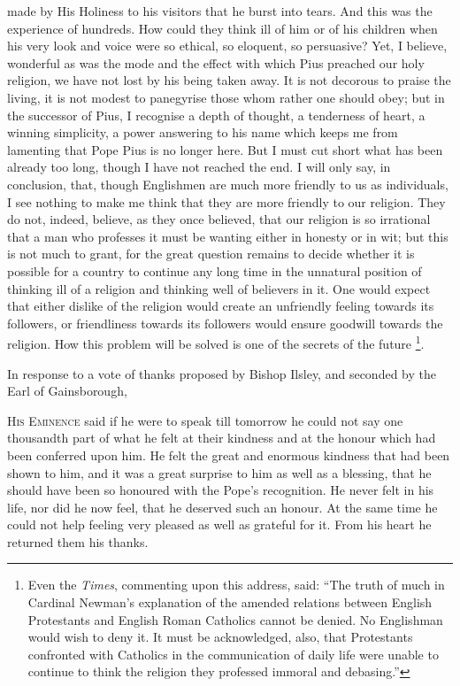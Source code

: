 made by His Holiness to his visitors that he burst into tears. And
this was the experience of hundreds. How could they think ill of him
or of his children when his very look and voice were so ethical, so
eloquent, so persuasive? Yet, I believe, wonderful as was the mode and
the effect with which Pius preached our holy religion, we have not
lost by his being taken away. It is not decorous to praise the living,
it is not modest to panegyrise those whom rather one should obey; but
in the successor of Pius, I recognise a depth of thought, a tenderness
of heart, a winning simplicity, a power answering to his name which
keeps me from lamenting that Pope Pius is no longer here. But I must
cut short what has been already too long, though I have not reached
the end. I will only say, in conclusion, that, though Englishmen are
much more friendly to us as individuals, I see nothing to make me
think that they are more friendly to our religion. They do not,
indeed, believe, as they once believed, that our religion is so
irrational that a man who professes it must be wanting either in
honesty or in wit; but this is not much to grant, for the great
question remains to decide whether it is possible for a country to
continue any long time in the unnatural position of thinking ill of a
religion and thinking well of believers in it. One would expect that
either dislike of the religion would create an unfriendly feeling
towards its followers, or friendliness towards its followers would
ensure goodwill towards the religion. How this problem will be solved
is one of the secrets of the future \footnote{Even the \emph{Times}, commenting upon this address, said: ``The truth
of much in Cardinal Newman's explanation of the amended relations
between English Protestants and English Roman Catholics cannot be
denied. No Englishman would wish to deny it. It must be acknowledged,
also, that Protestants confronted with Catholics in the communication
of daily life were unable to continue to think the religion they
professed immoral and debasing.''}.

In response to a vote of thanks
proposed by Bishop Ilsley, and seconded by the Earl of Gainsborough,

H\textsc{is} E\textsc{minence}
said if he were to speak till tomorrow he could not say one thousandth
part of what he felt at their kindness and at the honour which had
been conferred upon him. He felt the great and enormous kindness that
had been shown to him, and it was a great surprise to him as well as a
blessing, that he should have been so honoured with the Pope's
recognition. He never felt in his life, nor did he now feel, that he
deserved such an honour. At the same time he could not help feeling
very pleased as well as grateful for it. From his heart he returned
them his thanks.

